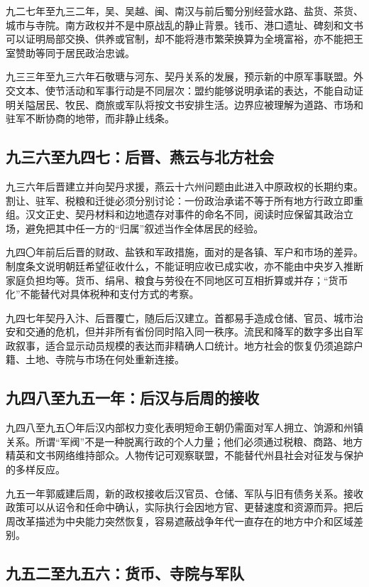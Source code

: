 九二七年至九三二年，吴、吴越、闽、南汉与前后蜀分别经营水路、盐货、茶货、城市与寺院。南方政权并不是中原战乱的静止背景。钱币、港口遗址、碑刻和文书可以证明局部交换、供养或官制，却不能将港市繁荣换算为全境富裕，亦不能把王室赞助等同于居民政治忠诚。

九三三年至九三六年石敬瑭与河东、契丹关系的发展，预示新的中原军事联盟。外交文本、使节活动和军事行动是不同层次：盟约能够说明承诺的表达，不能自动证明关隘居民、牧民、商旅或军队将按文书安排生活。边界应被理解为道路、市场和驻军不断协商的地带，而非静止线条。

\subsection{九三六至九四七：后晋、燕云与北方社会}

九三六年后晋建立并向契丹求援，燕云十六州问题由此进入中原政权的长期约束。割让、驻军、税粮和迁徙必须分别讨论：一份政治承诺不等于所有地方行政立即重组。汉文正史、契丹材料和边地遗存对事件的命名不同，阅读时应保留其政治立场，避免把其中任一方的“归属”叙述当作全体居民的经验。

九四〇年前后后晋的财政、盐铁和军政措施，面对的是各镇、军户和市场的差异。制度条文说明朝廷希望征收什么，不能证明应收已成实收，亦不能由中央岁入推断家庭负担均等。货币、绢帛、粮食与劳役在不同地区可互相折算或并存；“货币化”不能替代对具体税种和支付方式的考察。

九四七年契丹入汴、后晋覆亡，随后后汉建立。首都易手造成仓储、官员、城市治安和交通的危机，但并非所有省份同时陷入同一秩序。流民和降军的数字多出自军政叙事，适合显示动员规模的表达而非精确人口统计。地方社会的恢复仍须追踪户籍、土地、寺院与市场在何处重新连接。

\subsection{九四八至九五一年：后汉与后周的接收}

九四八至九五〇年后汉内部权力变化表明短命王朝仍需面对军人拥立、饷源和州镇关系。所谓“军阀”不是一种脱离行政的个人力量；他们必须通过税粮、商路、地方精英和文书网络维持部众。人物传记可观察联盟，不能替代州县社会对征发与保护的多样反应。

九五一年郭威建后周，新的政权接收后汉官员、仓储、军队与旧有债务关系。接收政策可以从诏令和任命中确认，实际执行会因地方官、更替速度和资源而异。把后周改革描述为中央能力突然恢复，容易遮蔽战争年代一直存在的地方中介和区域差别。

\subsection{九五二至九五六：货币、寺院与军队}

